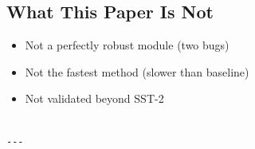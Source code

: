 \subsection{What This Paper Is Not}

\begin{itemize}
\item Not a perfectly robust module (two bugs)
\item Not the fastest method (slower than baseline)
\item Not validated beyond SST-2
\end{itemize}
\begin{lstlisting}

---
\end{lstlisting}
